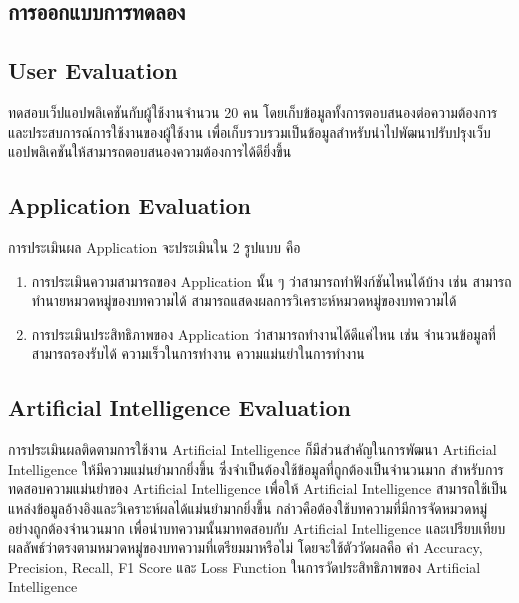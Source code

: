 \documentclass[12pt,oneside,openright,a4paper]{cpe-thai-project}
\begin{document}
\begin{itemize}
\section{การออกแบบการทดลอง}
\subsection{User Evaluation}
\hspace*{1cm}ทดสอบเว็ปแอปพลิเคชันกับผู้ใช้งานจำนวน 20 คน โดยเก็บข้อมูลทั้งการตอบสนองต่อความต้องการและประสบการณ์การใช้งานของผู้ใช้งาน 
เพื่อเก็บรวบรวมเป็นข้อมูลสำหรับนำไปพัฒนาปรับปรุงเว็บแอปพลิเคชันให้สามารถตอบสนองความต้องการได้ดียิ่งขึ้น
\subsection{Application Evaluation}
\hspace*{1cm}การประเมินผล Application จะประเมินใน 2 รูปแบบ คือ
  \begin{enumerate}
    \item การประเมินความสามารถของ Application นั้น ๆ ว่าสามารถทำฟังก์ชันไหนได้บ้าง เช่น สามารถทำนายหมวดหมู่ของบทความได้ สามารถแสดงผลการวิเคราะห์หมวดหมู่ของบทความได้
    \item การประเมินประสิทธิภาพของ Application ว่าสามารถทำงานได้ดีแค่ไหน เช่น จำนวนข้อมูลที่สามารถรองรับได้ ความเร็วในการทำงาน ความแม่นยำในการทำงาน
  \end{enumerate}
\subsection{Artificial Intelligence Evaluation}
\hspace*{1cm}การประเมินผลติดตามการใช้งาน Artificial Intelligence ก็มีส่วนสำคัญในการพัฒนา Artificial Intelligence ให้มีความแม่นยำมากยิ่งขึ้น 
ซึ่งจำเป็นต้องใช้ข้อมูลที่ถูกต้องเป็นจำนวนมาก สำหรับการทดสอบความแม่นยำของ Artificial Intelligence เพื่อให้ Artificial Intelligence สามารถใช้เป็นแหล่งข้อมูลอ้างอิงและวิเคราะห์ผลได้แม่นยำมากยิ่งขึ้น
กล่าวคือต้องใช้บทความที่มีการจัดหมวดหมู่อย่างถูกต้องจำนวนมาก เพื่อนำบทความนั้นมาทดสอบกับ Artificial Intelligence และเปรียบเทียบผลลัพธ์ว่าตรงตามหมวดหมู่ของบทความที่เตรียมมาหรือไม่
โดยจะใช้ตัววัดผลคือ ค่า Accuracy, Precision, Recall, F1 Score และ Loss Function ในการวัดประสิทธิภาพของ Artificial Intelligence




\end{itemize}
\end{document}
